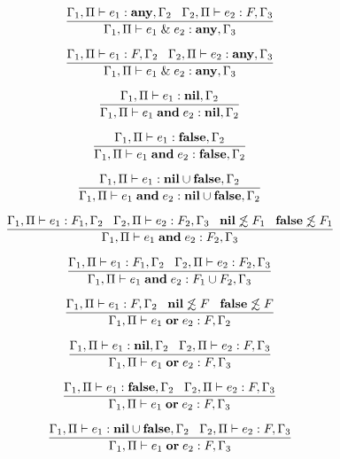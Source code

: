 \[
\dfrac{\Gamma_{1}, \Pi \vdash e_{1}:\mathbf{any}, \Gamma_{2} \;\;\;
       \Gamma_{2}, \Pi \vdash e_{2}:F, \Gamma_{3}}
      {\Gamma_{1}, \Pi \vdash e_{1} \;\&\; e_{2}:\mathbf{any}, \Gamma_{3}}
\]

\[
\dfrac{\Gamma_{1}, \Pi \vdash e_{1}:F, \Gamma_{2} \;\;\;
       \Gamma_{2}, \Pi \vdash e_{2}:\mathbf{any}, \Gamma_{3}}
      {\Gamma_{1}, \Pi \vdash e_{1} \;\&\; e_{2}:\mathbf{any}, \Gamma_{3}}
\]

\[
\dfrac{\Gamma_{1}, \Pi \vdash e_{1}:\mathbf{nil}, \Gamma_{2}}
      {\Gamma_{1}, \Pi \vdash e_{1} \; \mathbf{and} \; e_{2}:\mathbf{nil}, \Gamma_{2}}
\]

\[
\dfrac{\Gamma_{1}, \Pi \vdash e_{1}:\mathbf{false}, \Gamma_{2}}
      {\Gamma_{1}, \Pi \vdash e_{1} \; \mathbf{and} \; e_{2}:\mathbf{false}, \Gamma_{2}}
\]

\[
\dfrac{\Gamma_{1}, \Pi \vdash e_{1}:\mathbf{nil} \cup \mathbf{false}, \Gamma_{2}}
      {\Gamma_{1}, \Pi \vdash e_{1} \; \mathbf{and} \; e_{2}:\mathbf{nil} \cup \mathbf{false}, \Gamma_{2}}
\]

\[
\dfrac{\Gamma_{1}, \Pi \vdash e_{1}:F_{1}, \Gamma_{2} \;\;\;
       \Gamma_{2}, \Pi \vdash e_{2}:F_{2}, \Gamma_{3} \;\;\;
       \mathbf{nil} \not\lesssim F_{1} \;\;\;
       \mathbf{false} \not\lesssim F_{1}}
      {\Gamma_{1}, \Pi \vdash e_{1} \; \mathbf{and} \; e_{2}:F_{2}, \Gamma_{3}}
\]

\[
\dfrac{\Gamma_{1}, \Pi \vdash e_{1}:F_{1}, \Gamma_{2} \;\;\;
       \Gamma_{2}, \Pi \vdash e_{2}:F_{2}, \Gamma_{3}}
      {\Gamma_{1}, \Pi \vdash e_{1} \; \mathbf{and} \; e_{2}:F_{1} \cup F_{2}, \Gamma_{3}}
\]

\[
\dfrac{\Gamma_{1}, \Pi \vdash e_{1}:F, \Gamma_{2} \;\;\;
       \mathbf{nil} \not\lesssim F \;\;\;
       \mathbf{false} \not\lesssim F}
      {\Gamma_{1}, \Pi \vdash e_{1} \; \mathbf{or} \; e_{2}:F, \Gamma_{2}}
\]

\[
\dfrac{\Gamma_{1}, \Pi \vdash e_{1}:\mathbf{nil}, \Gamma_{2} \;\;\;
       \Gamma_{2}, \Pi \vdash e_{2}:F, \Gamma_{3}}
      {\Gamma_{1}, \Pi \vdash e_{1} \; \mathbf{or} \; e_{2}:F, \Gamma_{3}}
\]

\[
\dfrac{\Gamma_{1}, \Pi \vdash e_{1}:\mathbf{false}, \Gamma_{2} \;\;\;
       \Gamma_{2}, \Pi \vdash e_{2}:F, \Gamma_{3}}
      {\Gamma_{1}, \Pi \vdash e_{1} \; \mathbf{or} \; e_{2}:F, \Gamma_{3}}
\]

\[
\dfrac{\Gamma_{1}, \Pi \vdash e_{1}:\mathbf{nil} \cup \mathbf{false}, \Gamma_{2} \;\;\;
       \Gamma_{2}, \Pi \vdash e_{2}:F, \Gamma_{3}}
      {\Gamma_{1}, \Pi \vdash e_{1} \; \mathbf{or} \; e_{2}:F, \Gamma_{3}}
\]

